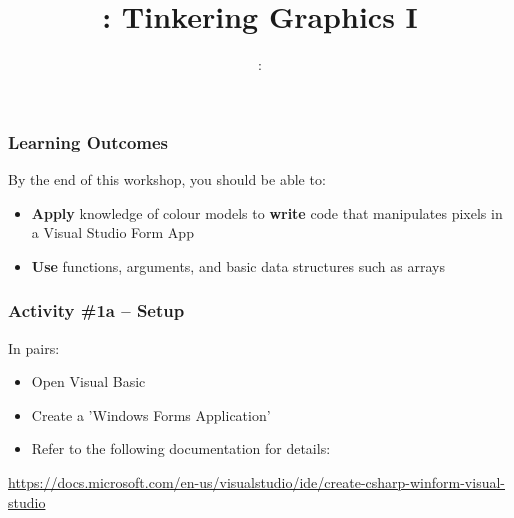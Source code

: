 \usepackage{../../beamerthemeFalmouthGamesAcademy}
\usepackage{multimedia}
\graphicspath{ {../../} }


\usepackage[normalem]{ulem}
\usepackage{wasysym}

\usepackage{pdfpages}

\usetikzlibrary{arrows,automata}







\title{\sessionnumber: Tinkering Graphics I}
\subtitle{\modulecode: \moduletitle}

\frame{\titlepage} 

\begin{frame}
	\frametitle{Learning Outcomes}
	By the end of this workshop, you should be able to:	
	\begin{itemize}
		\item \textbf{Apply} knowledge of colour models to \textbf{write} code that manipulates pixels in a Visual Studio Form App
		\item \textbf{Use} functions, arguments, and basic data structures such as arrays
	\end{itemize}
\end{frame}

\begin{frame}
	\frametitle{Activity \#1a -- Setup}
	
	In pairs:
	
	\vspace{2em}
	
	\begin{itemize}		
		\item Open Visual Basic 
		\item Create a 'Windows Forms Application'
		\item Refer to the following documentation for details:
	\end{itemize}
\scriptsize \url{https://docs.microsoft.com/en-us/visualstudio/ide/create-csharp-winform-visual-studio}
\end{frame}

